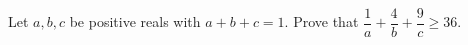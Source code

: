 Let $a,b,c$ be positive reals with $a+b+c=1$. Prove that $\dfrac{1}{a}+\dfrac{4}{b}+\dfrac{9}{c}\ge36$.
